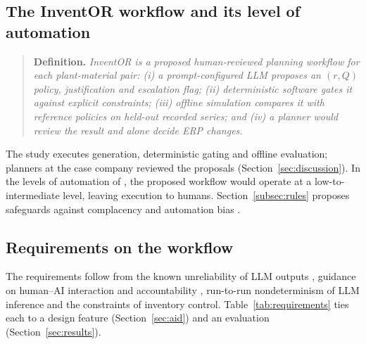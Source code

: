 \documentclass[preprint,12pt,nonatbib]{elsarticle}
\let\cite\parencite
\begin{document}
\subsection{The InventOR workflow and its level of automation}
\label{subsec:definition}
\begin{quote}
\textbf{Definition.} \emph{InventOR is a proposed human-reviewed planning workflow for each plant-material pair: (i) a prompt-configured LLM proposes an $(r,Q)$ policy, justification and escalation flag; (ii) deterministic software gates it against explicit constraints; (iii) offline simulation compares it with reference policies on held-out recorded series; and (iv) a planner would review the result and alone decide ERP changes.}
\end{quote}
The study executes generation, deterministic gating and offline evaluation; planners at the case company reviewed the proposals (Section~\ref{sec:discussion}). In the levels of automation of \textcite{parasuraman2000model}, the proposed workflow would operate at a low-to-intermediate level, leaving execution to humans. Section~\ref{subsec:rules} proposes safeguards against complacency and automation bias \cite{parasuraman2010complacency}.

\subsection{Requirements on the workflow}
\label{subsec:requirements}
The requirements follow from the known unreliability of LLM outputs \cite{ji2023survey}, guidance on human--AI interaction and accountability \cite{amershi2019guidelines, raji2020accountability}, run-to-run nondeterminism of LLM inference \cite{ouyang2025nondeterminism} and the constraints of inventory control. Table~\ref{tab:requirements} ties each to a design feature (Section~\ref{sec:aid}) and an evaluation (Section~\ref{sec:results}).
\end{document}
